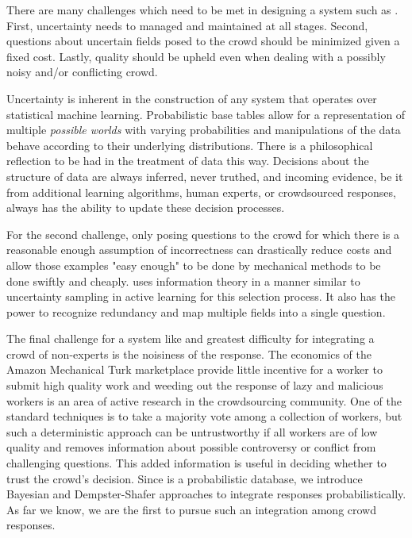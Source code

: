 {There are many challenges which need to be met in designing a system
such as \sysName .  First, uncertainty needs to managed and
maintained at all stages.  Second, questions about uncertain fields
posed to the crowd should be minimized given a fixed cost.  Lastly,
quality should be upheld even when dealing with a possibly noisy
and/or conflicting crowd.

Uncertainty is inherent in the construction of any system that
operates over statistical machine learning.  Probabilistic base
tables allow for a representation of multiple \textit{possible
worlds} with varying probabilities and manipulations of the data
behave according to their underlying distributions.  There is a
philosophical reflection to be had in the treatment of data this
way.  Decisions about the structure of data are always inferred,
never truthed, and incoming evidence, be it from additional learning
algorithms, human experts, or crowdsourced responses, always has the
ability to update these decision processes.

For the second challenge, only posing questions to the crowd for
which there is a reasonable enough assumption of incorrectness can
drastically reduce costs and allow those examples "easy enough" to
be done by mechanical methods to be done swiftly and cheaply.
\sysName uses information theory in a manner similar to uncertainty
sampling in active learning for this selection process.  It also has
the power to recognize redundancy and map multiple fields into a
single question.

The final challenge for a system like \sysName and greatest
difficulty for integrating a crowd of non-experts is the noisiness
of the response.  The economics of the Amazon Mechanical Turk
marketplace provide little incentive for a worker to submit high
quality work and weeding out the response of lazy and malicious
workers is an area of active research in the crowdsourcing
community.  One of the standard techniques is to take a majority
vote among a collection of workers, but such a deterministic
approach can be untrustworthy if all workers are of low quality and
removes information about possible controversy or conflict from
challenging questions.  This added information is useful in deciding
whether to trust the crowd's decision.  Since \sysName is a
probabilistic database, we introduce Bayesian and Dempster-Shafer
approaches to integrate responses probabilistically.  As far we
know, we are the first to pursue such an integration among crowd
responses.

}
